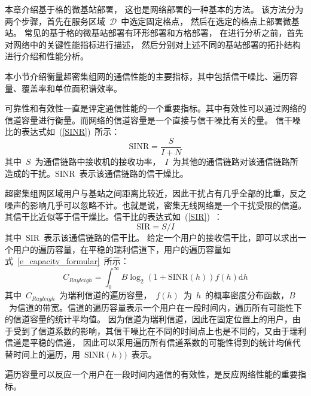 

本章介绍基于格的微基站部署，
这也是网络部署的一种基本的方法。
该方法分为两个步骤，首先在服务区域~$\mathcal{D}$~中选定固定格点，
然后在选定的格点上部署微基站。
常见的基于格的微基站部署有环形部署和方格部署，
在进行分析之前，首先对网络中的关键性能指标进行描述，
然后分别对上述不同的基站部署的拓扑结构进行介绍和性能分析。

本小节介绍衡量超密集组网的通信性能的主要指标，其中包括信干噪比、遍历容量、覆盖率和单位面积谱效率。


可靠性和有效性一直是评定通信性能的一个重要指标。其中有效性可以通过网络的信道容量进行衡量。而网络的信道容量是一个直接与信干噪比有关的量。
信干噪比的表达式如~(\ref{SINR})~所示：
\begin{equation}\label{SINR}
  \mathrm{SINR}=\frac{S}{I+N}
\end{equation}
其中~$S$~为通信链路中接收机的接收功率，~$I$~为其他的通信链路对该通信链路所造成的干扰。$\mathrm{SINR}$~表示该通信链路的信干燥比。

超密集组网区域用户与基站之间距离比较近，因此干扰占有几乎全部的比重，反之噪声的影响几乎可以忽略不计。也就是说，密集无线网络是一个干扰受限的信道。其信干比近似等于信干燥比。信干比的表达式如~(\ref{SIR})~：
\begin{equation}\label{SIR}
  \mathrm{SIR}=S/I
\end{equation}
其中~$\mathrm{SIR}$~表示该通信链路的信干比。
给定一个用户的接收信干比，即可以求出一个用户的遍历容量，在平稳的瑞利信道下，用户的遍历容量如式~\ref{e_capacity_formular}~所示：
\begin{equation}\label{e_capacity_formular}
  C_{Rayleigh} = \int_{0}^{\infty} B \log_2(1+\mathrm{SINR}(h)) f(h) \mathrm{d} h
\end{equation}
其中~$C_{Rayleigh}$~为瑞利信道的遍历容量，~$f(h)$~为~$h$~的概率密度分布函数，$B$~为信道的带宽。信道的遍历容量表示一个用户在一段时间内，遍历所有可能性下的信道容量的统计平均值。
因为信道为瑞利信道，因此在固定位置上的用户，由于受到了信道系数的影响，其信干噪比在不同的时间点上也是不同的，又由于瑞利信道是平稳的信道，
因此可以采用遍历所有信道系数的可能性得到的统计均值代替时间上的遍历，用~$\mathrm{SINR}(h))$~表示。

遍历容量可以反应一个用户在一段时间内通信的有效性，是反应网络性能的重要指标。


